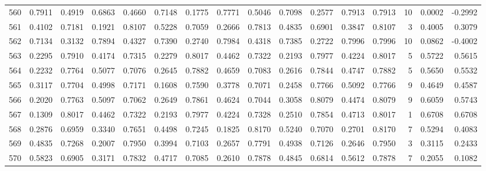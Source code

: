 \begin{tabular}{lrrrrrrrrrrrrrrr}
560 &      0.7911 &  0.4919 &  0.6863 &  0.4660 &  0.7148 &  0.1775 &  0.7771 &  0.5046 &  0.7098 &  0.2577 &   0.7913 &     0.7913 &     10 &                    0.0002 &                    -0.2992 \\
561 &      0.4102 &  0.7181 &  0.1921 &  0.8107 &  0.5228 &  0.7059 &  0.2666 &  0.7813 &  0.4835 &  0.6901 &   0.3847 &     0.8107 &      3 &                    0.4005 &                     0.3079 \\
562 &      0.7134 &  0.3132 &  0.7894 &  0.4327 &  0.7390 &  0.2740 &  0.7984 &  0.4318 &  0.7385 &  0.2722 &   0.7996 &     0.7996 &     10 &                    0.0862 &                    -0.4002 \\
563 &      0.2295 &  0.7910 &  0.4174 &  0.7315 &  0.2279 &  0.8017 &  0.4462 &  0.7322 &  0.2193 &  0.7977 &   0.4224 &     0.8017 &      5 &                    0.5722 &                     0.5615 \\
564 &      0.2232 &  0.7764 &  0.5077 &  0.7076 &  0.2645 &  0.7882 &  0.4659 &  0.7083 &  0.2616 &  0.7844 &   0.4747 &     0.7882 &      5 &                    0.5650 &                     0.5532 \\
565 &      0.3117 &  0.7704 &  0.4998 &  0.7171 &  0.1608 &  0.7590 &  0.3778 &  0.7071 &  0.2458 &  0.7766 &   0.5092 &     0.7766 &      9 &                    0.4649 &                     0.4587 \\
566 &      0.2020 &  0.7763 &  0.5097 &  0.7062 &  0.2649 &  0.7861 &  0.4624 &  0.7044 &  0.3058 &  0.8079 &   0.4474 &     0.8079 &      9 &                    0.6059 &                     0.5743 \\
567 &      0.1309 &  0.8017 &  0.4462 &  0.7322 &  0.2193 &  0.7977 &  0.4224 &  0.7328 &  0.2510 &  0.7854 &   0.4713 &     0.8017 &      1 &                    0.6708 &                     0.6708 \\
568 &      0.2876 &  0.6959 &  0.3340 &  0.7651 &  0.4498 &  0.7245 &  0.1825 &  0.8170 &  0.5240 &  0.7070 &   0.2701 &     0.8170 &      7 &                    0.5294 &                     0.4083 \\
569 &      0.4835 &  0.7268 &  0.2007 &  0.7950 &  0.3994 &  0.7103 &  0.2657 &  0.7791 &  0.4938 &  0.7126 &   0.2646 &     0.7950 &      3 &                    0.3115 &                     0.2433 \\
570 &      0.5823 &  0.6905 &  0.3171 &  0.7832 &  0.4717 &  0.7085 &  0.2610 &  0.7878 &  0.4845 &  0.6814 &   0.5612 &     0.7878 &      7 &                    0.2055 &                     0.1082 \\

\end{tabular}
